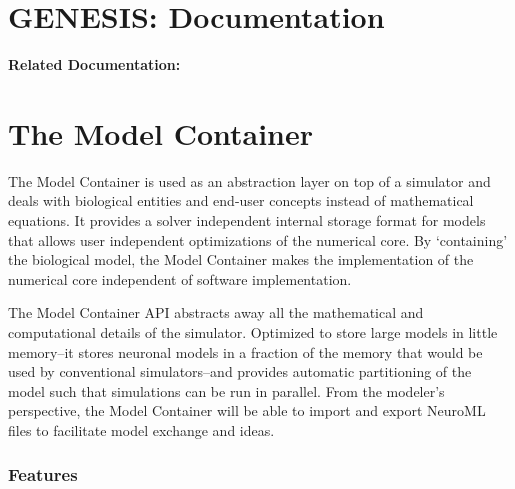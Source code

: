 \documentclass[12pt]{article}
\begin{document}
\section*{GENESIS: Documentation}

{\bf Related Documentation:}

\section*{The Model Container}

The Model Container is used as an abstraction layer on top of a simulator and deals with biological entities and end-user concepts instead of mathematical equations. It provides a solver independent internal storage format for models that allows user independent optimizations of the numerical core. By `containing' the biological model, the Model Container makes the implementation of the numerical core independent of software implementation.

The Model Container API abstracts away all the mathematical and computational details of the simulator. Optimized to store large models in little memory--it stores neuronal models in a fraction of the memory that would be used by conventional simulators--and provides automatic partitioning of the model such that simulations can be run in parallel. From the modeler's perspective, the Model Container will be able to import and export NeuroML files to facilitate model exchange and ideas.

\subsubsection*{Features}
\end{document}
